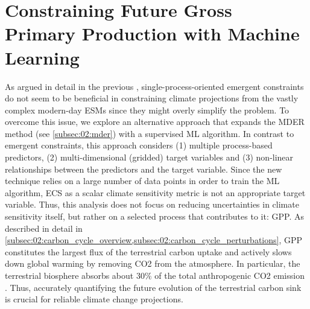 
%



\chapter{Constraining Future Gross Primary Production with Machine Learning}
\label{ch:06:paper_gpp}

As argued in detail in the previous ,
single-process-oriented emergent constraints do not seem to be beneficial in
constraining climate projections from the vastly complex modern-day \acp{ESM}
since they might overly simplify the problem. To overcome this issue, we
explore an alternative approach that expands the \acf{MDER} method (see
\cref{subsec:02:mder}) with a supervised \acf{ML} algorithm. In contrast to
emergent constraints, this approach considers (1) multiple process-based
predictors, (2) multi-dimensional (gridded) target variables and (3) non-linear
relationships between the predictors and the target variable. Since the new
technique relies on a large number of data points in order to train the \ac{ML}
algorithm, \ac{ECS} as a scalar climate sensitivity metric is not an
appropriate target variable. Thus, this analysis does not focus on reducing
uncertainties in climate sensitivity itself, but rather on a selected process
that contributes to it: \ac{GPP}. As described in detail in
\cref{subsec:02:carbon_cycle_overview,subsec:02:carbon_cycle_perturbations},
\ac{GPP} constitutes the largest flux of the terrestrial carbon uptake and
actively slows down global warming by removing \ac{CO2} from the atmosphere. In
particular, the terrestrial biosphere absorbs about $30 \unit{\%}$ of the total
anthropogenic \ac{CO2} emission \autocite{Friedlingstein2020}. Thus, accurately
quantifying the future evolution of the terrestrial carbon sink is crucial for
reliable climate change projections.


